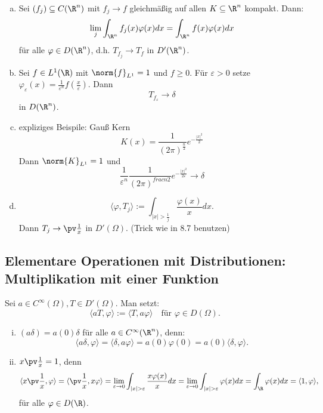 \begin{enumerate}[a)]
  \item Sei $(f_j) \subseteq C(\R^n)$ mit $f_j \to f$ gleichmäßig auf allen $K \subseteq \R^n$ kompakt. Dann:
    $$ \lim_j \int_{\R^n} f_j(x) \varphi(x) dx = \int_{\R^n} f(x)\varphi(x) dx$$
    für alle $\varphi \in D(\R^n)$, d.h. $T_{f_j} \to T_f$ in $D'(\R^n)$.

  \item Sei $f \in L^1(\R)$ mit $\norm{f}_{L^1} = 1$ und $f \geq 0$.
    Für $\varepsilon > 0$ setze $\varphi_\varepsilon(x) = \frac{1}{\varepsilon^n}f(\frac{x}{\varepsilon}).$
    Dann
    $$
    T_{f_\varepsilon} \to \delta$$
    in $D(\R^n)$.

  \item expliziges Beispile: Gauß Kern
    $$
    K(x) = \frac{1}{(2\pi)^{\frac{n}{2}}} e^{-\frac{|x|^2}{2}}
    $$
    Dann $\norm{K}_{L^1} = 1$ und 
    $$
    \frac{1}{\varepsilon^n}\frac{1}{(2\pi)^{frac{n}{2}}} e^{-\frac{|x|^2}{2\varepsilon}} \to \delta
    $$

  \item
    $$
    \langle \varphi, T_j \rangle := \int_{|x| > \frac{1}{j}} \frac{\varphi(x)}{x} dx.
    $$
    Dann $T_j \to \pv \frac{1}{x}$ in $D'(\Omega)$. (Trick wie in 8.7 benutzen)
\end{enumerate}

\subsection{Elementare Operationen mit Distributionen: Multiplikation mit einer Funktion}

Sei $a \in C^\infty(\Omega), T \in D'(\Omega)$. 
Man setzt:
$$
\langle aT, \varphi\rangle := \langle T, a \varphi\rangle \quad \text{für } \varphi \in D(\Omega).
$$


\begin{ex}
  \begin{enumerate}[i)]
    \item $(a\delta) = a(0)\delta$ für alle $a \in C^\infty(\R^n)$, denn:
      $$
      \langle a\delta, \varphi\rangle  = \langle \delta, a\varphi\rangle = a(0)\varphi(0) = a(0)\langle \delta, \varphi\rangle.
      $$

    \item
      $x \pv \frac{1}{x} = 1$, denn
      $$
      \langle x \pv \frac{1}{x}, \varphi \rangle
      = \langle \pv \frac{1}{x}, x\varphi\rangle
      = \lim_{\varepsilon \to 0} \int_{|x| > \varepsilon} \frac{x \varphi(x)}{x} dx
      = \lim_{\varepsilon \to 0} \int_{|x| > \varepsilon} \varphi(x) dx
      = \int_\R \varphi(x) dx
      = \langle 1, \varphi \rangle,
      $$
      für alle $\varphi \in D(\R)$.
  \end{enumerate}
\end{ex}


